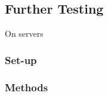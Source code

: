 \documentclass[final_report.tex]{subfiles}
\begin{document}
\subsection{Further Testing}
On servers

\subsubsection{Set-up}

\subsubsection{Methods}
\end{document}
